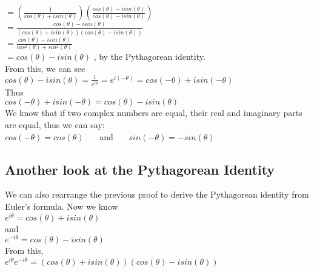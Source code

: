 \tab$=  (\frac{1}{cos(\theta) + isin(\theta)})(\frac{cos(\theta) - isin(\theta)}{cos(\theta) - isin(\theta)})$\\

\tab$=  \frac{cos(\theta) - isin(\theta)}{(cos(\theta) + isin(\theta))(cos(\theta) - isin(\theta))}$\\

\tab$=  \frac{cos(\theta) - isin(\theta)}{cos^2(\theta) + sin^2(\theta)}$\\

\tab$= cos(\theta) - isin(\theta)$ , by the Pythagorean identity.\\

From this, we can see\\

\tab$cos(\theta) - isin(\theta) = \frac{1}{e^{i\theta}} = e^{i(-\theta)} = cos(-\theta) + isin(-\theta)$\\

Thus\\

\tab$cos(-\theta) + isin(-\theta) = cos(\theta) - isin(\theta)$\\

We know that if two complex numbers are equal, their real and imaginary parts are equal, thus we can say:\\

\tab$cos(-\theta) = cos(\theta)$ \ \ \ and  \ \ \ $sin(-\theta) = -sin(\theta)$\\

\subsection{Another look at the Pythagorean Identity}

We can also rearrange the previous proof to derive the Pythagorean identity from Euler's formula.  Now we know\\

\tab$e^{i\theta} = cos(\theta) + isin(\theta)$\\

and\\

\tab$e^{-i\theta} = cos(\theta) - isin(\theta)$\\

From this,\\

\tab$e^{i\theta}e^{-i\theta} = (cos(\theta) + isin(\theta))(cos(\theta) - isin(\theta))$\\

